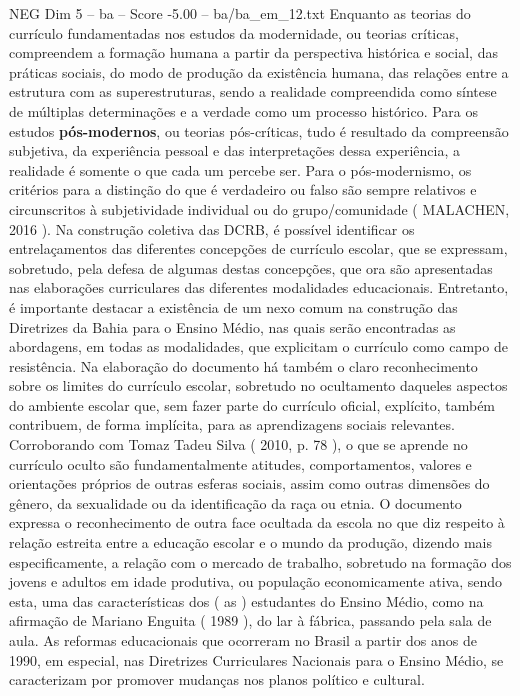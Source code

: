 \begin{textsample}{NEG Dim 5 – ba – Score -5.00 – ba/ba\_em\_12.txt}
Enquanto as teorias do currículo fundamentadas nos estudos da modernidade, ou teorias críticas, compreendem a formação humana a partir da perspectiva histórica e social, das práticas sociais, do modo de produção da existência humana, das relações entre a estrutura com as superestruturas, sendo a realidade compreendida como síntese de múltiplas determinações e a verdade como um processo histórico.
Para os estudos \textbf{pós-modernos}, ou teorias pós-críticas, tudo é resultado da compreensão subjetiva, da experiência pessoal e das interpretações dessa experiência, a realidade é somente o que cada um percebe ser.
Para o pós-modernismo, os critérios para a distinção do que é verdadeiro ou falso são sempre relativos e circunscritos à subjetividade individual ou do grupo/comunidade ( MALACHEN, 2016 ).
Na construção coletiva das DCRB, é possível identificar os entrelaçamentos das diferentes concepções de currículo escolar, que se expressam, sobretudo, pela defesa de algumas destas concepções, que ora são apresentadas nas elaborações curriculares das diferentes modalidades educacionais.
Entretanto, é importante destacar a existência de um nexo comum na construção das Diretrizes da Bahia para o Ensino Médio, nas quais serão encontradas as abordagens, em todas as modalidades, que explicitam o currículo como campo de resistência.
Na elaboração do documento há também o claro reconhecimento sobre os limites do currículo escolar, sobretudo no ocultamento daqueles aspectos do ambiente escolar que, sem fazer parte do currículo oficial, explícito, também contribuem, de forma implícita, para as aprendizagens sociais relevantes.
Corroborando com Tomaz Tadeu Silva ( 2010, p. 78 ), o que se aprende no currículo oculto são fundamentalmente atitudes, comportamentos, valores e orientações próprios de outras esferas sociais, assim como outras dimensões do gênero, da sexualidade ou da identificação da raça ou etnia.
O documento expressa o reconhecimento de outra face ocultada da escola no que diz respeito à relação estreita entre a educação escolar e o mundo da produção, dizendo mais especificamente, a relação com o mercado de trabalho, sobretudo na formação dos jovens e adultos em idade produtiva, ou população economicamente ativa, sendo esta, uma das características dos ( as ) estudantes do Ensino Médio, como na afirmação de Mariano Enguita ( 1989 ), do lar à fábrica, passando pela sala de aula.
As reformas educacionais que ocorreram no Brasil a partir dos anos de 1990, em especial, nas Diretrizes Curriculares Nacionais para o Ensino Médio, se caracterizam por promover mudanças nos planos político e cultural.

\end{textsample}
